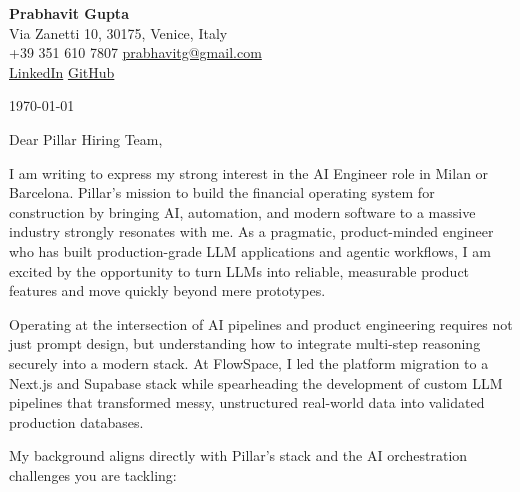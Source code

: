 \documentclass[11pt,a4paper]{article}
\begin{document}
\begin{center}
    {\huge \textbf{Prabhavit Gupta}} \\
    \vspace{4pt}
    Via Zanetti 10, 30175, Venice, Italy \\
    +39 351 610 7807 \textbar{} \href{mailto:prabhavitg@gmail.com}{prabhavitg@gmail.com} \\
    \href{https://www.linkedin.com/in/prabhavit/}{LinkedIn} \textbar{} \href{https://github.com/prab-gupta}{GitHub}
\end{center}

\vspace{20pt}

\noindent \today

\vspace{10pt}

\noindent Dear Pillar Hiring Team,

\vspace{10pt}

\noindent I am writing to express my strong interest in the AI Engineer role in Milan or Barcelona. Pillar’s mission to build the financial operating system for construction by bringing AI, automation, and modern software to a massive industry strongly resonates with me. As a pragmatic, product-minded engineer who has built production-grade LLM applications and agentic workflows, I am excited by the opportunity to turn LLMs into reliable, measurable product features and move quickly beyond mere prototypes.

\noindent Operating at the intersection of AI pipelines and product engineering requires not just prompt design, but understanding how to integrate multi-step reasoning securely into a modern stack. At FlowSpace, I led the platform migration to a Next.js and Supabase stack while spearheading the development of custom LLM pipelines that transformed messy, unstructured real-world data into validated production databases. 

\noindent My background aligns directly with Pillar's stack and the AI orchestration challenges you are tackling:
\end{document}
